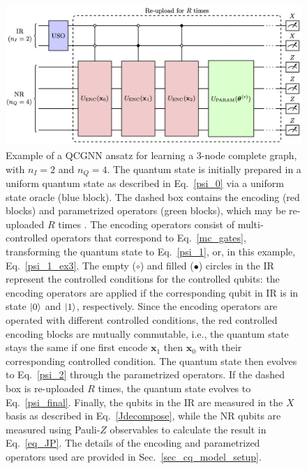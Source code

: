\documentclass[reprint,amsmath,amssymb,prd,nofootinbib]{revtex4-2}
\def\xbf{\mathbf{x}}
\begin{document}
\begin{figure}[htbp]
    \centering
    \includegraphics[width=\textwidth]{fig_qc_full.png}
    \caption{Example of a QCGNN ansatz for learning a 3-node complete graph, with $n_I=2$ and $n_Q=4$. The quantum state is initially prepared in a uniform quantum state as described in Eq.~\ref{psi_0} via a uniform state oracle (blue block). The dashed box contains the encoding (red blocks) and parametrized operators (green blocks), which may be re-uploaded $R$ times \cite{reupload}. The encoding operators consist of multi-controlled operators that correspond to Eq.~\ref{mc_gates}, transforming the quantum state to Eq.~\ref{psi_1}, or, in this example, Eq.~\ref{psi_1_ex3}. The empty ($\circ$) and filled ($\bullet$) circles in the IR represent the controlled conditions for the controlled qubits: the encoding operators are applied if the corresponding qubit in IR is in state $\ket{0}$ and $\ket{1}$, respectively. Since the encoding  operators are operated with different controlled conditions, the red controlled encoding blocks are mutually commutable, i.e., the quantum state stays the same if one first encode $\xbf_1$ then $\xbf_0$ with their corresponding controlled condition. The quantum state then evolves to Eq.~\ref{psi_2} through the parametrized operators. If the dashed box is re-uploaded $R$ times, the quantum state evolves to Eq.~\ref{psi_final}. Finally, the qubits in the IR are measured in the $X$ basis as described in Eq.~\ref{Jdecompose}, while the NR qubits are measured using Pauli-$Z$ observables to calculate the result in Eq.~\ref{eq_JP}. The details of the encoding and parametrized operators used are provided in Sec.~\ref{sec_cq_model_setup}.}
    \label{fig:exqcgnn}
\end{figure}
\end{document}
